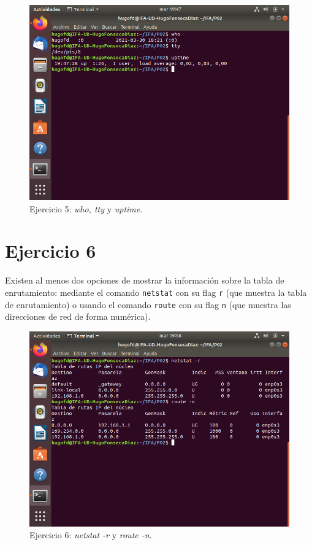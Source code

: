 \documentclass[11pt]{article}
\begin{document}
\begin{figure}[H]
    \caption{Ejercicio 5: \textit{who, tty} y \textit{uptime}.}
  \centering
  \includegraphics{e5.png}
\end{figure}

\section{Ejercicio 6}
Existen al menos dos opciones de mostrar la información sobre la tabla de enrutamiento: mediante el comando \verb|netstat| con su flag \verb|r| (que muestra la tabla de enrutamiento) o usando el comando \verb|route| con su flag \verb|n| (que muestra las direcciones de red de forma numérica).

\begin{figure}[H]
    \caption{Ejercicio 6: \textit{netstat -r} y \textit{route -n}.}
  \centering
  \includegraphics{e6.png}
\end{figure}
\end{document}
